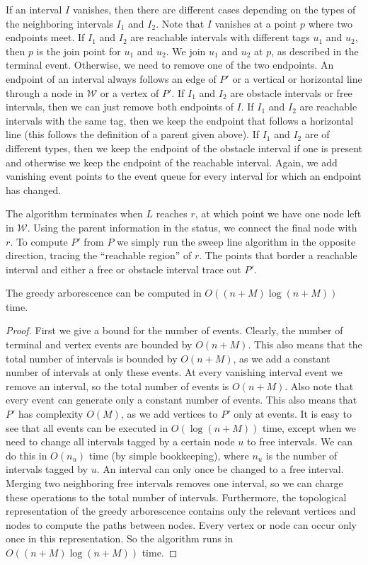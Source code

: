 \documentclass{journalA4}
\begin{document}
 If an interval $I$ vanishes, then there are different cases depending on the types of the neighboring intervals $I_1$ and $I_2$. Note that $I$ vanishes at a point $p$ where two endpoints meet. If $I_1$ and $I_2$ are reachable intervals with different tags $u_1$ and $u_2$, then $p$ is the join point for $u_1$ and $u_2$. We join $u_1$ and $u_2$ at $p$, as described in the terminal event. Otherwise, we need to remove one of the two endpoints. An endpoint of an interval always follows an edge of $P'$ or a vertical or horizontal line through a node in $\mathcal{W}$ or a vertex of $P'$. If $I_1$ and $I_2$ are obstacle intervals or free intervals, then we can just remove both endpoints of $I$. If $I_1$ and $I_2$ are reachable intervals with the same tag, then we keep the endpoint that follows a horizontal line (this follows the definition of a parent given above).
If $I_1$ and $I_2$ are of different types, then we keep the endpoint of the obstacle interval if one is present and otherwise we keep the endpoint of the reachable interval. Again, we add vanishing event points to the event queue for every interval for which an endpoint has changed.

\smallskip
\noindent
The algorithm terminates when $L$ reaches $r$, at which point we have one node left in $\mathcal{W}$. Using the parent information in the status, we
connect the final node with $r$. To compute $P'$ from $P$ we simply run the sweep line algorithm in the opposite direction, tracing the ``reachable region'' of $r$. The points that border a reachable interval and either a free or obstacle interval trace out $P'$.

\begin{lemma}
\label{lem:arbruntime} The greedy arborescence can be computed in $O((n+M) \log(n+M))$ time.
\end{lemma}
\begin{proof}
First we give a bound for the number of events. Clearly, the number of terminal and vertex events are bounded by $O(n+M)$. This also means that the total number of intervals is
bounded by $O(n+M)$, as we add a constant number of intervals at only these events. At every vanishing interval event we remove an interval, so the total number of events is
$O(n+M)$. Also note that every event can generate only a constant number of events. This also means that $P'$ has complexity $O(M)$, as we add vertices to $P'$ only at events. It is
easy to see that all events can be executed in $O(\log(n+M))$ time, except when we need to change all intervals tagged by a certain node $u$ to free intervals. We can do this in
$O(n_u)$ time (by simple bookkeeping), where $n_u$ is the number of intervals tagged by $u$. An interval can only once be changed to a free interval. Merging two neighboring free
intervals removes one interval, so we can charge these operations to the total number of intervals. Furthermore, the topological representation of the greedy arborescence contains only the relevant vertices and nodes to compute the paths between nodes. Every vertex or node can occur only once in this representation. So the algorithm runs in $O((n+M) \log(n+M))$ time.
\end{proof}
\end{document}
